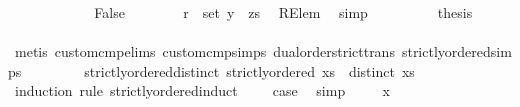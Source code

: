 \begin{isabellebody}
\ \ \ \ \isamarkupfalse%
\isanewline
\ \ \ \ \ \ \isamarkupfalse%
\ False\isanewline
\ \ \ \ \ \ \isamarkupfalse%
\ {\isachardoublequoteopen}r\ {\isasymin}\ set\ {\isacharparenleft}{\kern0pt}y\ {\isacharhash}{\kern0pt}\ zs{\isacharparenright}{\kern0pt}{\isachardoublequoteclose}\ \isamarkupfalse%
\ RElem\ \isamarkupfalse%
\ simp\isanewline
\ \ \ \ \ \ \isamarkupfalse%
\ \isamarkupfalse%
\ {\isacharquery}{\kern0pt}thesis\ \isamarkupfalse%
\ {}\ \isanewline
\ \ \ \ \ \ \ \ \isamarkupfalse%
\ {\isacharparenleft}{\kern0pt}metis\ custom{\isacharunderscore}{\kern0pt}cmp{\isachardot}{\kern0pt}elims{\isacharparenleft}{\kern0pt}{}{\isacharparenright}{\kern0pt}\ custom{\isacharunderscore}{\kern0pt}cmp{\isachardot}{\kern0pt}simps{\isacharparenleft}{\kern0pt}{}{\isacharparenright}{\kern0pt}\ dual{\isacharunderscore}{\kern0pt}order{\isachardot}{\kern0pt}strict{\isacharunderscore}{\kern0pt}trans\ strictly{\isacharunderscore}{\kern0pt}ordered{\isachardot}{\kern0pt}simps{\isacharparenleft}{\kern0pt}{}{\isacharparenright}{\kern0pt}{\isacharparenright}{\kern0pt}\isanewline
\ \ \ \ \isamarkupfalse%
\isanewline
\ \ \isamarkupfalse%
\isanewline
{}\isamarkupfalse%
%
\endisatagproof
{\isafoldproof}%
%
\isadelimproof
\isanewline
%
\endisadelimproof
\isanewline
{}\isamarkupfalse%
\ strictly{\isacharunderscore}{\kern0pt}ordered{\isacharunderscore}{\kern0pt}distinct{\isacharcolon}{\kern0pt}\ {\isachardoublequoteopen}strictly{\isacharunderscore}{\kern0pt}ordered\ xs\ {\isasymLongrightarrow}\ distinct\ xs{\isachardoublequoteclose}\isanewline
%
\isadelimproof
%
\endisadelimproof
%
\isatagproof
{}\isamarkupfalse%
\ {\isacharparenleft}{\kern0pt}induction\ rule{\isacharcolon}{\kern0pt}\ strictly{\isacharunderscore}{\kern0pt}ordered{\isachardot}{\kern0pt}induct{\isacharparenright}{\kern0pt}\isanewline
{}\isamarkupfalse%
\ {}\isanewline
{}\isamarkupfalse%
\ \isamarkupfalse%
\ {\isacharquery}{\kern0pt}case\ \isamarkupfalse%
\ simp\isanewline
{}\isamarkupfalse%
\isanewline
\ \ \isamarkupfalse%
\ {\isacharparenleft}{\kern0pt}{}\ x{\isacharparenright}{\kern0pt}\isanewline
\ \ \isamarkupfalse%
\ \isamarkupfalse%

\end{isabellebody}
